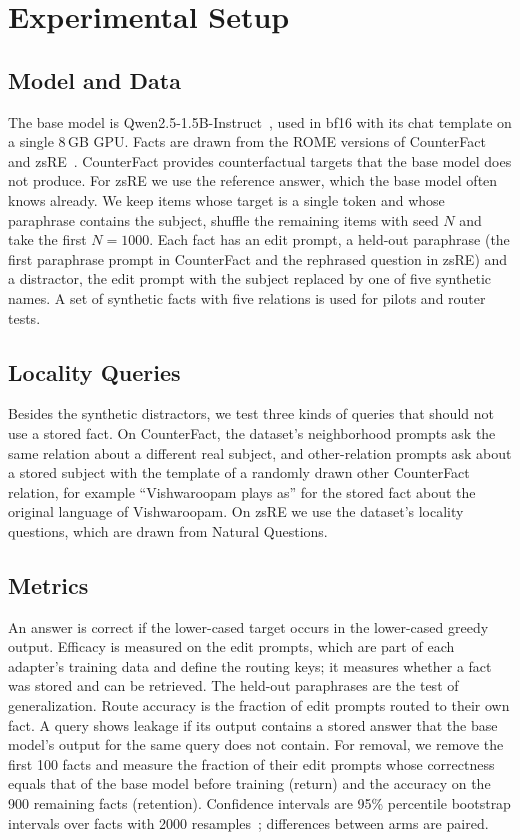 \documentclass[journal,10pt]{IEEEtran}
\begin{document}
\section{Experimental Setup}
\label{sec:setup}

\subsection{Model and Data}
The base model is Qwen2.5-1.5B-Instruct~\cite{qwen2024qwen25}, used in bf16 with its
chat template on a single 8\,GB GPU. Facts are drawn from the ROME versions of
CounterFact~\cite{meng2022rome} and zsRE~\cite{levy2017zeroshot,decao2021editing}.
CounterFact provides counterfactual targets that the base model does not produce. For
zsRE we use the reference answer, which the base model often knows already. We keep items
whose target is a single token and whose paraphrase contains the subject, shuffle the
remaining items with seed $N$ and take the first $N=1000$. Each fact has an edit prompt,
a held-out paraphrase (the first paraphrase prompt in CounterFact and the rephrased
question in zsRE) and a distractor, the edit prompt with the subject replaced by one of
five synthetic names. A set of synthetic facts with five relations is used for pilots
and router tests.

\subsection{Locality Queries}
Besides the synthetic distractors, we test three kinds of queries that should not use a
stored fact. On CounterFact, the dataset's neighborhood prompts ask the same relation
about a different real subject, and other-relation prompts ask about a stored subject
with the template of a randomly drawn other CounterFact relation, for example
``Vishwaroopam plays as'' for the stored fact about the original language of
Vishwaroopam. On zsRE we use the dataset's locality questions, which are drawn from
Natural Questions.

\subsection{Metrics}
An answer is correct if the lower-cased target occurs in the lower-cased greedy output.
Efficacy is measured on the edit prompts, which are part of each adapter's training data
and define the routing keys; it measures whether a fact was stored and can be retrieved.
The held-out paraphrases are the test of generalization. Route accuracy is the fraction of
edit prompts routed to their own fact. A query shows leakage if its output contains a
stored answer that the base model's output for the same query does not contain. For
removal, we remove the first 100 facts and measure the fraction of their edit prompts
whose correctness equals that of the base model before training (return) and the
accuracy on the 900 remaining facts (retention). Confidence intervals are 95\% percentile
bootstrap intervals over facts with 2000 resamples~\cite{efron1994bootstrap}; differences
between arms are paired.
\end{document}
